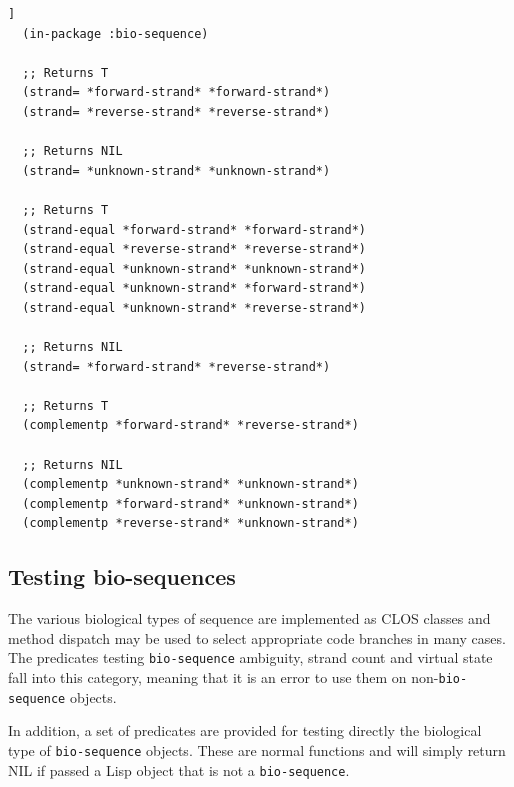 \documentclass[a4paper, 12pt]{article}
\begin{document}
\begin{lstlisting}[caption={Sequence strand operations},
  label=lst:strand-ops-bioseq,float=[tbph]]
  (in-package :bio-sequence)

  ;; Returns T
  (strand= *forward-strand* *forward-strand*)
  (strand= *reverse-strand* *reverse-strand*)

  ;; Returns NIL
  (strand= *unknown-strand* *unknown-strand*)
  
  ;; Returns T
  (strand-equal *forward-strand* *forward-strand*)
  (strand-equal *reverse-strand* *reverse-strand*)
  (strand-equal *unknown-strand* *unknown-strand*)
  (strand-equal *unknown-strand* *forward-strand*)
  (strand-equal *unknown-strand* *reverse-strand*)
  
  ;; Returns NIL
  (strand= *forward-strand* *reverse-strand*)
  
  ;; Returns T
  (complementp *forward-strand* *reverse-strand*)

  ;; Returns NIL
  (complementp *unknown-strand* *unknown-strand*)
  (complementp *forward-strand* *unknown-strand*)
  (complementp *reverse-strand* *unknown-strand*)
\end{lstlisting}


\subsection{Testing bio-sequences}

The various biological types of sequence are implemented as CLOS
classes and method dispatch may be used to select appropriate code
branches in many cases. The predicates testing
\lstinline!bio-sequence! ambiguity, strand count and virtual state
fall into this category, meaning that it is an error to use them on
non-\lstinline!bio-sequence! objects.

In addition, a set of predicates are provided for testing directly the
biological type of \lstinline!bio-sequence! objects. These are normal
functions and will simply return NIL if passed a Lisp object that is
not a \lstinline!bio-sequence!.
\end{document}
